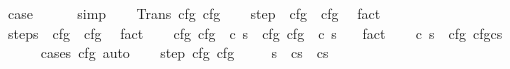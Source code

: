 \begin{isabellebody}
\ {\isacharquery}case\isanewline
\ \ \ \ \isamarkupfalse%
\ simp\isanewline
{}\isamarkupfalse%
\isanewline
\ \ \isamarkupfalse%
\ {\isacharparenleft}Trans\ cfg\ cfg{\isacharprime}{\isacharprime}{\isacharparenright}\isanewline
\ \ \isamarkupfalse%
\ step{\isacharcolon}\ {\isachardoublequoteopen}{\isasymGamma}{\isasymturnstile}\ cfg\ {\isasymrightarrow}\ cfg{\isacharprime}{\isacharprime}{\isachardoublequoteclose}\ \isamarkupfalse%
\ fact\isanewline
\ \ \isamarkupfalse%
\ steps{\isacharcolon}\ {\isachardoublequoteopen}{\isasymGamma}{\isasymturnstile}\ cfg{\isacharprime}{\isacharprime}\ {\isasymrightarrow}\isactrlsup {\isacharasterisk}\ cfg\ \isamarkupfalse%
\ fact\isanewline
\ \ \isamarkupfalse%
\ cfg\ {\isachardoublequoteopen}cfg\ {\isacharequal}\ {\isacharparenleft}c\ s{\isacharparenright}{\isachardoublequoteclose}\ \ cfg\ {\isachardoublequoteopen}cfg\ {\isacharequal}\ {\isacharparenleft}c\ s{\isacharprime}{\isacharparenright}{\isachardoublequoteclose}\ \ \isamarkupfalse%
\ fact{\isacharplus}\isanewline
\ \ \isamarkupfalse%
\ c\ s{\isacharprime}{\isacharprime}\ \ cfg{\isacharprime}{\isacharprime}{\isacharcolon}\ {\isachardoublequoteopen}cfg{\isacharprime}{\isacharprime}{\isacharequal}{\isacharparenleft}cs{\isacharprime}{\isacharprime}{\isacharparenright}{\isachardoublequoteclose}\isanewline
\ \ \ \ \isamarkupfalse%
\ {\isacharparenleft}cases\ cfg{\isacharprime}{\isacharprime}{\isacharparenright}\ auto\isanewline
\ \ \isamarkupfalse%
\ step\ cfg\ cfg{\isacharprime}{\isacharprime}\ \isanewline
\ \ \isamarkupfalse%
\ s{\isacharcolon}\ {\isachardoublequoteopen}{\isasymGamma}{\isasymturnstile}\ {\isacharparenleft}cs{\isacharparenright}\ {\isasymrightarrow}\ {\isacharparenleft}cs{\isacharprime}{\isacharprime}{\isacharparenright}{\isachardoublequoteclose}\isanewline

\end{isabellebody}
